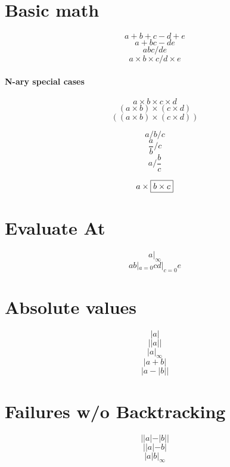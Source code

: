 \documentclass{article}
\begin{document}
%
%
%
%
%

\section{Basic math}
\[ a + b + c - d + e \]
\[ a + b c - d  e \]
\[ a b c / d e \]
\[ a \times b \times c / d \times e \]

\paragraph{N-ary special cases}
\[ a \times b \times c \times d \]
\[ (a \times b) \times (c \times d) \]
\[ ((a \times b) \times (c \times d)) \]

\[ a / b / c \]
\[ \frac{a}{b} / c \]
\[ a / \frac{b}{c} \]

\[ a \times \fbox{$b \times c$}\]
\section{Evaluate At}
\[  a |_\infty \]
\[ a b |_{a=0} c d |_{c=0} e \]

\section{Absolute values}
\[  |a| \]
\[ ||a|| \]
\[  |a |_\infty \]
\[  |a + b| \]
\[  |a - |b|| \]

\section{Failures w/o Backtracking}
\[  ||a| - |b|| \]
\[ ||a|-b| \]
\[  |a | b |_\infty \]
\end{document}
